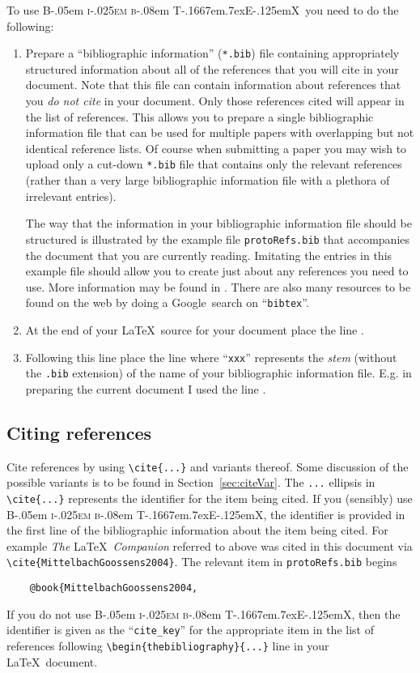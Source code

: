 \documentclass[times, doublespace]{anzsauth}
\newcommand\BibTeX{{\rmfamily B\kern-.05em \textsc{i\kern-.025em b}\kern-.08em
T\kern-.1667em\lower.7ex\hbox{E}\kern-.125emX}}
\begin{document}
To use \BibTeX\ you need to do the following:
\begin{enumerate}
\item Prepare a ``bibliographic information'' (\texttt{*.bib})
file containing appropriately structured information about all of
the references that you will cite in your document.  Note that this
file can contain information about references that you \emph{do not
cite} in your document.  Only those references cited will appear
in the list of references.  This allows you to prepare a single
bibliographic information file that can be used for multiple papers
with overlapping but not identical reference lists.  Of course
when submitting a paper you may wish to upload only a cut-down
\texttt{*.bib} file that contains only the relevant references
(rather than a very large bibliographic information file with a
plethora of irrelevant entries).

The way that the information in your bibliographic information
file should be structured is illustrated by the example file
\texttt{protoRefs.bib} that accompanies the document that you are
currently reading.  Imitating the entries in this example file should
allow you to create just about any references you need to use.
More information may be found in \cite{MittelbachGoossens2004}.
There are also many resources to be found on the web by doing a
Google\texttrademark\ search on ``\texttt{bibtex}''.

\item At the end of your \LaTeX\ source for your document place the line
\verb!!.
\item Following this line place the line \verb!!
where ``\texttt{xxx}'' represents the \emph{stem} (without the \texttt{.bib}
extension) of the name of your bibliographic information file.
E.g. in preparing the current document I used the line
\verb!!.
\end{enumerate}

\subsection{Citing references}
\label{sec:citRef}
Cite references by using \verb!\cite{...}! and variants
thereof.  Some discussion of the possible variants is to be
found in Section~\ref{sec:citeVar}.  The \verb!...! ellipsis
in \verb!\cite{...}! represents the identifier for the item
being cited.  If you (sensibly) use \BibTeX, the identifier
is provided in the first line of the bibliographic information
about the item being cited.  For example \textit{The} \LaTeX\
\textit{Companion} referred to above was cited in this document
via \verb!\cite{MittelbachGoossens2004}!.  The relevant item in
\texttt{protoRefs.bib} begins
\begin{verbatim}
    @book{MittelbachGoossens2004,
\end{verbatim}
If you do not use \BibTeX, then the identifier
is given as the ``\verb!cite_key!'' for the appropriate item
in the list of references following \verb!\begin{thebibliography}{...}!
line in your \LaTeX\ document.
\end{document}
